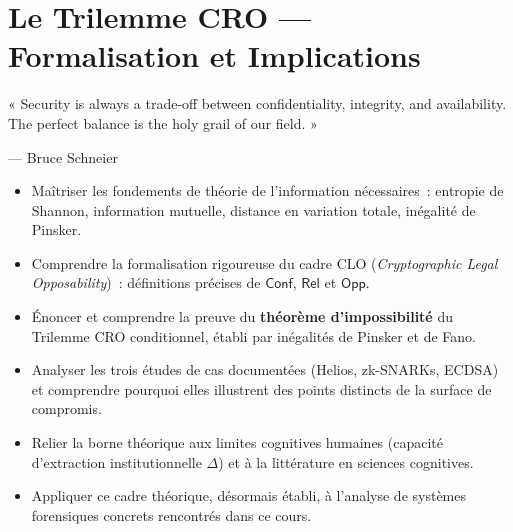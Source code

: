 
\chapter{Le Trilemme CRO --- Formalisation et Implications}
\label{chap:CRO}

\epigraph{%
    « Security is always a trade-off between confidentiality, integrity,
    and availability. The perfect balance is the holy grail of our
    field. »%
}{--- Bruce Schneier}


\begin{boxobjectifs}
\begin{itemize}
    \item Maîtriser les fondements de théorie de l'information
          nécessaires~: entropie de Shannon, information mutuelle,
          distance en variation totale, inégalité de Pinsker.
    \item Comprendre la formalisation rigoureuse du cadre CLO
          (\textit{Cryptographic Legal Opposability})~: définitions
          précises de $\mathsf{Conf}$, $\mathsf{Rel}$ et $\mathsf{Opp}$.
    \item Énoncer et comprendre la preuve du \textbf{théorème
          d'impossibilité} du Trilemme CRO conditionnel, établi
          par inégalités de Pinsker et de Fano.
    \item Analyser les trois études de cas documentées (Helios,
          zk-SNARKs, ECDSA) et comprendre pourquoi elles illustrent
          des points distincts de la surface de compromis.
    \item Relier la borne théorique aux limites cognitives humaines
          (capacité d'extraction institutionnelle $\Delta$) et à la
          littérature en sciences cognitives.
    \item Appliquer ce cadre théorique, désormais établi, à l'analyse
          de systèmes forensiques concrets rencontrés dans ce cours.
\end{itemize}
\end{boxobjectifs}

